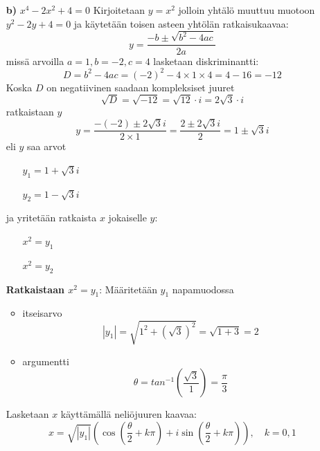 \documentclass{article}
\begin{document}
\begin{itemize}
\newpage
    \item [{\textbf{b)}}] $x^4 - 2x^2 + 4 = 0$ \newline
    Kirjoitetaan $y = x^2$ jolloin yhtälö muuttuu muotoon $y^2 - 2y + 4 = 0$ ja käytetään toisen asteen yhtölän ratkaisukaavaa:
    \[
    y = \frac{-b \pm \sqrt{b^2 - 4ac}}{2a}
    \]
    missä arvoilla $a=1, b=-2, c=4$ lasketaan diskriminantti:
    \[
    D = b^2 - 4ac = (-2)^2 - 4 \times 1 \times 4 = 4 - 16 = -12
    \]
    Koska $D$ on negatiivinen saadaan kompleksiset juuret
    \[
        \sqrt{D} = \sqrt{-12} = \sqrt{12} \cdot i = 2\sqrt{3} \cdot i
    \]
    ratkaistaan $y$
    \[
    y = \frac{-(-2) \pm 2\sqrt{3} i}{2 \times 1} = \frac{2 \pm 2\sqrt{3} i}{2} = 1 \pm \sqrt{3} i
    \]
    eli $y$ saa arvot
    \begin{itemize}
        \item[] $y_1 = 1 + \sqrt{3} i$
        \item[] $y_2 = 1 - \sqrt{3} i$
    \end{itemize}
    ja yritetään ratkaista $x$ jokaiselle $y$:
    \begin{itemize}
        \item[] $x^2 = y_1$
        \item[] $x^2 = y_2$
    \end{itemize}
    \textbf{Ratkaistaan $x^2 = y_1$}:\newline
    Määritetään $y_1$ napamuodossa\newline
    \begin{itemize}
        \item itseisarvo
        \[
            |y_1| = \sqrt{1^2 + (\sqrt{3})^2} = \sqrt{1 + 3} = 2
        \]
        \item argumentti
        \[
            \theta = tan^{-1}\left( \frac{\sqrt{3}}{1} \right) = \frac{\pi}{3}
        \]
    \end{itemize}
    Lasketaan $x$ käyttämällä neliöjuuren kaavaa:
    \[
        x = \sqrt{|y_1|} \left( \cos\left( \frac{\theta}{2} + k\pi \right) + i \sin\left( \frac{\theta}{2} + k\pi \right) \right), \quad k = 0, 1
    \]


\end{itemize}
\end{document}
